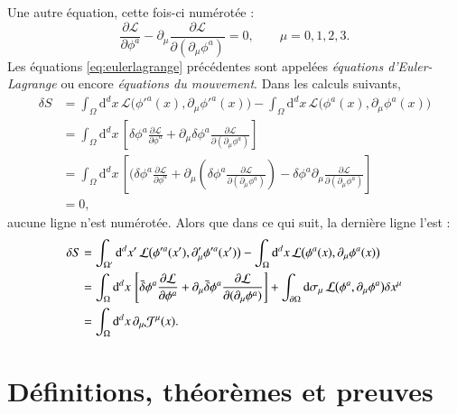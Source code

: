 Une autre équation, cette fois-ci numérotée :
\begin{equation}
	\label{eq:eulerlagrange}
	\frac{\partial\mathcal{L}}{\partial\phi^a}-\partial_\mu\frac{\partial\mathcal{L}}{\partial(\partial_\mu\phi^a)}=0,\qquad\mu=0,1,2,3.
\end{equation}
Les équations \eqref{eq:eulerlagrange} précédentes sont appelées \emph{équations d'Euler-Lagrange} ou encore \emph{équations du mouvement}. Dans les calculs suivants,
\begin{align*}
	\delta S	& = \int_\Omega\mathrm{d}^dx\,\mathcal{L}\bigl(\phi'^a(x),\partial_\mu\phi'^a(x)\bigr)-\int_\Omega\mathrm{d}^dx\,\mathcal{L}\bigl(\phi^a(x),\partial_\mu\phi^a(x)\bigr)																												\\
				& = \int_\Omega\mathrm{d}^dx\,\left[\delta\phi^a\frac{\partial\mathcal{L}}{\partial\phi^a}+\partial_\mu\delta\phi^a\frac{\partial\mathcal{L}}{\partial(\partial_\mu\phi^a)}\right]																									\\
				& = \int_\Omega\mathrm{d}^dx\,\left[(\delta\phi^a\frac{\partial\mathcal{L}}{\partial\phi^a}+\partial_\mu\left(\delta\phi^a\frac{\partial\mathcal{L}}{\partial(\partial_\mu\phi^a)}\right)-\delta\phi^a\partial_\mu\frac{\partial\mathcal{L}}{\partial(\partial_\mu\phi^a)}\right]	\\
				& = 0,
\end{align*}
aucune ligne n'est numérotée. Alors que dans ce qui suit, la derni\`ere ligne l'est :
\begin{align}
	\delta S	& = \int_{\Omega'}\mathrm{d}^dx'\,\mathcal{L}\bigl(\phi'^a(x'),\partial'_\mu\phi'^a(x')\bigr)-\int_\Omega\mathrm{d}^dx\,\mathcal{L}\bigl(\phi^a(x),\partial_\mu\phi^a(x)\bigr)																															\notag\\
				& = \int_\Omega\mathrm{d}^dx\,\left[\bar{\delta}\phi^a\frac{\partial\mathcal{L}}{\partial\phi^a}+\partial_\mu\bar{\delta}\phi^a\frac{\partial\mathcal{L}}{\partial(\partial_\mu\phi^a)}\right]+\int_{\partial\Omega}\mathrm{d}\sigma_\mu\,\mathcal{L}\bigl(\phi^a,\partial_\mu\phi^a\bigr)\delta x^\mu	\notag\\
				& = \int_\Omega\mathrm{d}^dx\,\partial_\mu\mathcal{J}^\mu(x).	\label{eq:variationaction}
\end{align}


\section{Définitions, théor\`emes et preuves}

